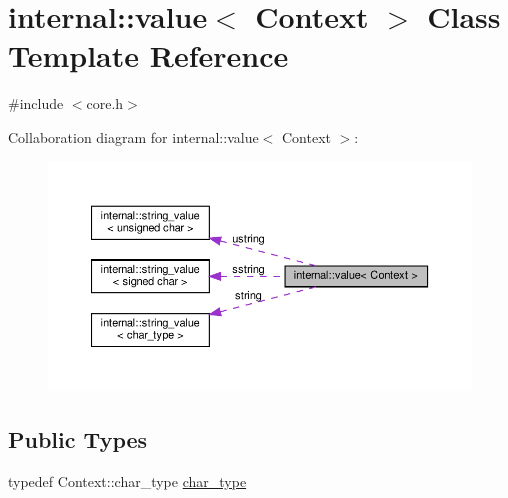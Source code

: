 \hypertarget{classinternal_1_1value}{}\section{internal\+:\+:value$<$ Context $>$ Class Template Reference}
\label{classinternal_1_1value}


{\ttfamily \#include $<$core.\+h$>$}



Collaboration diagram for internal\+:\+:value$<$ Context $>$\+:
\nopagebreak
\begin{figure}[H]
\begin{center}
\leavevmode
\includegraphics[width=350pt]{classinternal_1_1value__coll__graph}
\end{center}
\end{figure}
\subsection*{Public Types}
\begin{DoxyCompactItemize}
\item 
typedef Context\+::char\+\_\+type \hyperlink{classinternal_1_1value_aea7e71c59ab9961b645ed79e69aff80e}{char\+\_\+type}
\end{DoxyCompactItemize}
